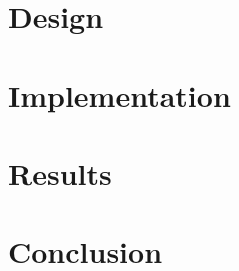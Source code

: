 





\newpage
\setcounter{tocdepth}{2}

\tableofcontents
\vfill


\vspace{1 cm}

\newpage




\section{Design}
\label{sec:design}


\section{Implementation}
\label{sec:implementation}



\section{Results}
\label{sec:results}


\section{Conclusion}
\label{sec:conclusion}


%




